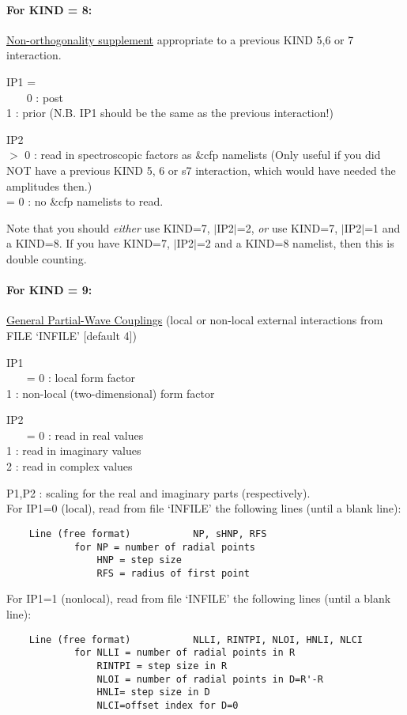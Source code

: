 \documentclass[11pt]{article}
\begin{document}
\begin{description}
\paragraph{For KIND = 8:}
\underline{Non-orthogonality supplement}
appropriate to a previous
KIND 5,6 or 7 interaction.


 IP1 = \\
~~~  0 : post
\\  1 : prior
 (N.B. IP1 should be the same as the previous interaction!)



IP2
\\  $>$ 0 : read in spectroscopic factors as \&cfp namelists
 (Only useful if you did NOT have a previous KIND 5, 6 or s7
interaction, which would have needed the amplitudes then.)
\\  = 0 : no \&cfp namelists to read.


Note that you should {\em either} use KIND=7, $|$IP2$|$=2,
{\em or} use  KIND=7, $|$IP2$|$=1  and a KIND=8.
If you have KIND=7, $|$IP2$|$=2 and a KIND=8 namelist, then this is
double counting.
\bigskip


\paragraph{For KIND = 9:} 
\underline{General Partial-Wave Couplings}
(local or non-local external interactions from FILE `INFILE' [default 4])

IP1 \\
~~~  = 0 : local form factor
\\   1 : non-local (two-dimensional) form factor

IP2\\
~~~  = 0 : read in real values   
\\   1 : read in imaginary values   
\\   2 : read in complex values       

 P1,P2 : scaling for the real and imaginary parts (respectively).\\

For IP1=0 (local), read from file `INFILE' the following lines
   (until a blank line):
\begin{verbatim}
    Line (free format)           NP, sHNP, RFS
            for NP = number of radial points
                HNP = step size
                RFS = radius of first point
\end{verbatim}
For IP1=1 (nonlocal), read from file `INFILE' the following lines    (until a blank line):
\begin{verbatim}
    Line (free format)           NLLI, RINTPI, NLOI, HNLI, NLCI
            for NLLI = number of radial points in R
                RINTPI = step size in R
                NLOI = number of radial points in D=R'-R
                HNLI= step size in D
                NLCI=offset index for D=0
\end{verbatim}


\end{description}
\end{document}
